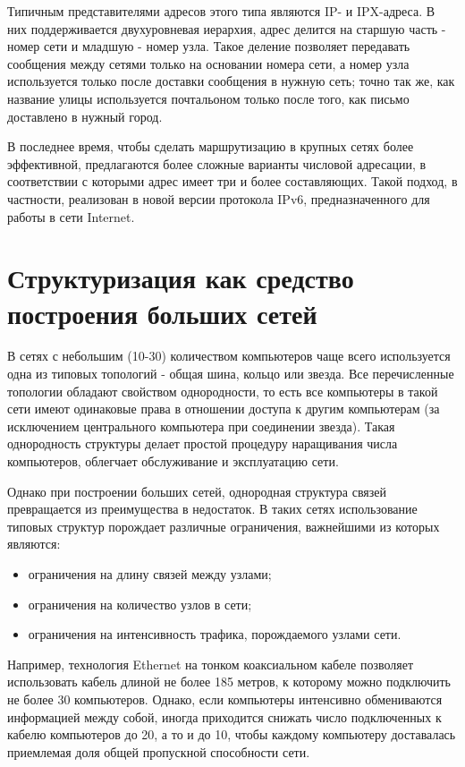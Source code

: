 Типичным представителями адресов этого типа являются IP- и IPX-адреса.
В них поддерживается двухуровневая иерархия, адрес делится на старшую часть - номер сети и младшую - номер узла.
Такое деление позволяет передавать сообщения между сетями только на основании номера сети, а номер узла используется только после доставки сообщения в нужную сеть; точно так же, как название улицы используется почтальоном только после того, как письмо доставлено в нужный город.

В последнее время, чтобы сделать маршрутизацию в крупных сетях более эффективной, предлагаются более сложные варианты числовой адресации, в соответствии с которыми адрес имеет три и более составляющих.
Такой подход, в частности, реализован в новой версии протокола IPv6, предназначенного для работы в сети Internet.

\section{Структуризация как средство построения больших сетей}

В сетях с небольшим (10-30) количеством компьютеров чаще всего используется одна из типовых топологий - общая шина, кольцо или звезда.
Все перечисленные топологии обладают свойством однородности, то есть все компьютеры в такой сети имеют одинаковые права в отношении доступа к другим компьютерам (за исключением центрального компьютера при соединении звезда).
Такая однородность структуры делает простой процедуру наращивания числа компьютеров, облегчает обслуживание и эксплуатацию сети.

Однако при построении больших сетей, однородная структура связей превращается из преимущества в недостаток.
В таких сетях использование типовых структур порождает различные ограничения, важнейшими из которых являются:
\begin{itemize}
    \item ограничения на длину связей между узлами;
    \item ограничения на количество узлов в сети;
    \item ограничения на интенсивность трафика, порождаемого узлами сети.
\end{itemize}

Например, технология Ethernet на тонком коаксиальном кабеле позволяет использовать кабель длиной не более 185 метров, к которому можно подключить не более 30 компьютеров.
Однако, если компьютеры интенсивно обмениваются информацией между собой, иногда приходится снижать число подключенных к кабелю компьютеров до 20, а то и до 10, чтобы каждому компьютеру доставалась приемлемая доля общей пропускной способности сети.

